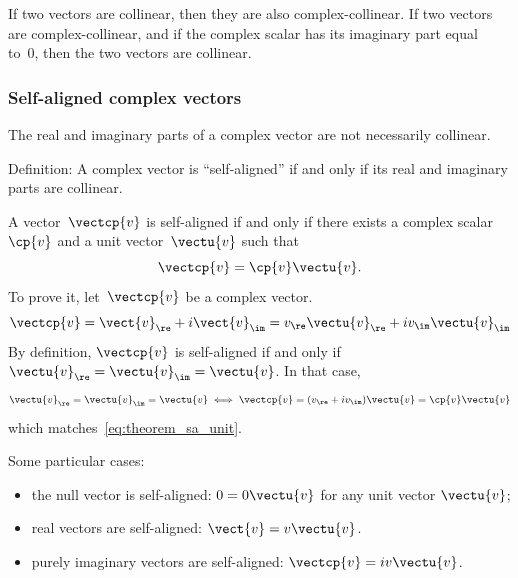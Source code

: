 \begin{refsection}
If two vectors are collinear, then they are also complex-collinear.
If two vectors are complex-collinear, and if the complex scalar has its imaginary part equal to~0, then the two vectors are collinear.

\subsubsection{Self-aligned complex vectors}
The real and imaginary parts of a complex vector are not necessarily collinear.

Definition: A complex vector is ``self-aligned'' if and only if its real and imaginary parts are collinear.

    A vector~$\vectcp{v}$ is self-aligned if and only if there exists a complex scalar~$\cp{v}$ and a unit vector~$\vectu{v}$ such that
    \begin{equation}
        \vectcp{v} = \cp{v} \vectu{v}
        \text{.}
        \label{eq:theorem_sa_unit}
    \end{equation}
    To prove it, let~$\vectcp{v}$ be a complex vector.
    \begin{equation}
        \vectcp{v}
        =
        \vect{v}_\re + i \vect{v}_\im
        =
        v_\re \vectu{v}_\re + i v_\im \vectu{v}_\im
    \end{equation}
    By definition, $\vectcp{v}$ is self-aligned if and only if $\vectu{v}_\re = \vectu{v}_\im = \vectu{v}$.
    In that case,
    \begin{equation}
        \vectu{v}_\re = \vectu{v}_\im = \vectu{v}
        \iff
        \vectcp{v} = (v_\re + i v_\im) \vectu{v} = \cp{v} \vectu{v}
    \end{equation}
    which matches~\cref{eq:theorem_sa_unit}.

Some particular cases:
\begin{itemize}
    \item the null vector is self-aligned: $0 = 0 \vectu{v}$ for any unit vector $\vectu{v}$;
    \item real vectors are self-aligned: $\vect{v} = v \vectu{v}$.
    \item purely imaginary vectors are self-aligned: $\vectcp{v} = iv \vectu{v}$.
\end{itemize}






\end{refsection}
